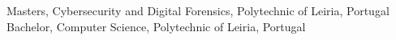 %
%
%

\vspace{-0.5em}
\vspace{0.5em}
\begin{scholarship}
	{Masters, Cybersecurity and Digital Forensics, Polytechnic of Leiria, Portugal}
	{Bachelor, Computer Science, Polytechnic of Leiria, Portugal}
\end{scholarship}